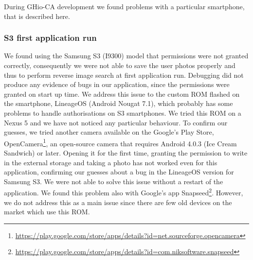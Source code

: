 During GHio-CA development we found problems with a particular smartphone, that 
is described here.

\subsubsection{S3 first application run}

We found using the Samsung S3 (I9300) model that permissions were not granted 
correctly, consequently we were not able to save the user photos properly and 
thus to perform reverse image search at first application run. Debugging did not 
produce any evidence of bugs in our application, since the permissions were 
granted on start up time.
We address this issue to the custom ROM flashed on the smartphone, LineageOS 
(Android Nougat 7.1), which probably has some problems to handle authorisations 
on S3 smartphones. We tried this ROM on a Nexus 5 and we have not noticed any 
particular behaviour.
To confirm our guesses, we tried another camera available on the Google's Play 
Store, OpenCamera\footnote{\url{
https://play.google.com/store/apps/details?id=net.sourceforge.opencamera}}, an 
open-source camera that requires Android 4.0.3 (Ice Cream Sandwich) or later.
Opening it for the first time, granting the permission to write in the external 
storage and taking a photo has not worked even for this application, confirming 
our guesses about a bug in the LineageOS version for Samsung S3.
We were not able to solve this issue without a restart of the application. We 
found this problem also with Google's app 
Snapseed\footnote{\url{
https://play.google.com/store/apps/details?id=com.niksoftware.snapseed}}.
However, we do not address this as a main issue since there are few old devices 
on the market which use this ROM.
